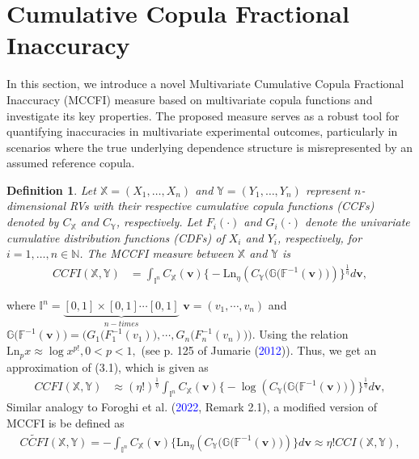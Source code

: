\documentclass[12pt, a4paper]{article}
\numberwithin{equation}{section}
\newtheorem{definition}{Definition}[section]
\begin{document}
\section{Cumulative Copula Fractional Inaccuracy}\label{sec3}
In this section, we introduce a novel Multivariate Cumulative Copula Fractional Inaccuracy (MCCFI) measure based on multivariate copula functions and investigate its key properties. The proposed measure serves as a robust tool for quantifying inaccuracies in multivariate experimental outcomes, particularly in scenarios where the true underlying dependence structure is misrepresented by an assumed reference copula.
\begin{definition}
Let $\mathbb{X}=(X_1,\dots,X_n)$ and $\mathbb{Y}=(Y_1,\dots,Y_n)$ represent $n$-dimensional RVs with their respective cumulative copula functions (CCFs) denoted by $C_\mathbb{X}$ and $C_\mathbb{Y}$, respectively. Let $F_i(\cdot)$ and $G_i(\cdot)$ denote the univariate cumulative distribution functions (CDFs) of $X_i$ and $Y_i$, respectively, for $i=1,\dots,n\in\mathbb{N}$.   The MCCFI measure between $\mathbb{X}$ and $\mathbb{Y}$ is
\begin{align}\label{eq3.1}
CCFI(\mathbb{X},\mathbb{Y})&=\int_{\mathbb I^n}C_\mathbb{X}(\textbf{v})\Big\{-\mathrm{Ln}_\eta \left(C_\mathbb{Y}\big(\mathbb{G}({\mathbb F}^{-1}(\textbf{v})\big)\right)\Big\}^{\frac{1}{\eta}}d\textbf{v},
\end{align}
\end{definition}
where $\mathbb I^n=\underbrace{[0,1]\times[0,1]\cdots[0,1]}_{n-times}$ $\textbf{v}=(v_1,\cdots,v_n)$ and $\mathbb{G}\big(\mathbb{F}^{-1}(\textbf{v})\big)=\big(G_1\big(F_1^{-1}(v_1)\big),\cdots,G_n\big(F_n^{-1}(v_n)\big)\big)$.
Using the relation $\mathrm{Ln}_p x\approx \log x^{p!}, 0<p<1,$ (see p. 125 of Jumarie (\textcolor{blue}{2012})). Thus, we get an approximation of (3.1), which is given as 
\begin{align}\label{eq2.1}
	CCFI(\mathbb{X},\mathbb{Y})&\approx (\eta!)^{\frac{1}{\eta}}\int_{\mathbb I^n}C_\mathbb{X}(\textbf{v})\Big\{-\log \left(C_\mathbb{Y}\big(\mathbb{G}({\mathbb F}^{-1}(\textbf{v})\big)\right)\Big\}^{\frac{1}{\eta}}d\textbf{v},
\end{align}
Similar analogy to Foroghi et al. (\textcolor{blue}{2022}, Remark 2.1), a modified version of MCCFI is be defined as 
\begin{align}\label{eq2.1}
	\widetilde{CCFI}(\mathbb{X},\mathbb{Y})= -\int_{\mathbb I^n}C_\mathbb{X}(\textbf{v})\Big\{\mathrm{Ln}_\eta \left(C_\mathbb{Y}\big(\mathbb{G}({\mathbb F}^{-1}(\textbf{v})\big)\right)\Big\}d\textbf{v}\approx \eta! CCI(\mathbb X,\mathbb Y),
\end{align}
\end{document}
